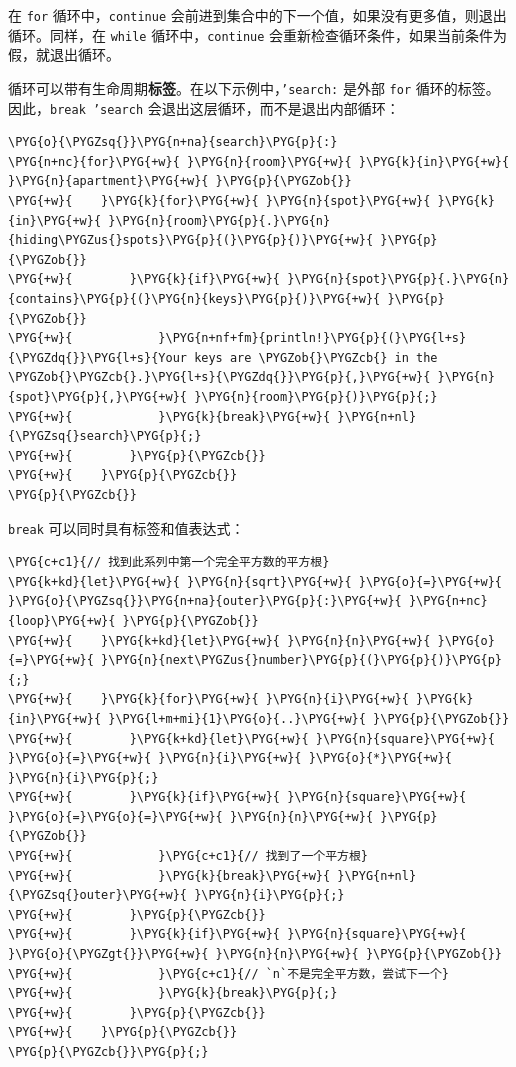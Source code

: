 在 \texttt{for} 循环中，\texttt{continue} 会前进到集合中的下一个值，如果没有更多值，则退出循环。同样，在 \texttt{while} 循环中，\texttt{continue} 会重新检查循环条件，如果当前条件为假，就退出循环。

循环可以带有生命周期\textbf{标签}。在以下示例中，\texttt{'search:} 是外部 \texttt{for} 循环的标签。因此，\texttt{break 'search} 会退出这层循环，而不是退出内部循环：

\begin{Verbatim}[commandchars=\\\{\},breaklines=true,breakanywhere=true,fontsize=\codefont,xleftmargin=17bp]
\PYG{o}{\PYGZsq{}}\PYG{n+na}{search}\PYG{p}{:}
\PYG{n+nc}{for}\PYG{+w}{ }\PYG{n}{room}\PYG{+w}{ }\PYG{k}{in}\PYG{+w}{ }\PYG{n}{apartment}\PYG{+w}{ }\PYG{p}{\PYGZob{}}
\PYG{+w}{    }\PYG{k}{for}\PYG{+w}{ }\PYG{n}{spot}\PYG{+w}{ }\PYG{k}{in}\PYG{+w}{ }\PYG{n}{room}\PYG{p}{.}\PYG{n}{hiding\PYGZus{}spots}\PYG{p}{(}\PYG{p}{)}\PYG{+w}{ }\PYG{p}{\PYGZob{}}
\PYG{+w}{        }\PYG{k}{if}\PYG{+w}{ }\PYG{n}{spot}\PYG{p}{.}\PYG{n}{contains}\PYG{p}{(}\PYG{n}{keys}\PYG{p}{)}\PYG{+w}{ }\PYG{p}{\PYGZob{}}
\PYG{+w}{            }\PYG{n+nf+fm}{println!}\PYG{p}{(}\PYG{l+s}{\PYGZdq{}}\PYG{l+s}{Your keys are \PYGZob{}\PYGZcb{} in the \PYGZob{}\PYGZcb{}.}\PYG{l+s}{\PYGZdq{}}\PYG{p}{,}\PYG{+w}{ }\PYG{n}{spot}\PYG{p}{,}\PYG{+w}{ }\PYG{n}{room}\PYG{p}{)}\PYG{p}{;}
\PYG{+w}{            }\PYG{k}{break}\PYG{+w}{ }\PYG{n+nl}{\PYGZsq{}search}\PYG{p}{;}
\PYG{+w}{        }\PYG{p}{\PYGZcb{}}
\PYG{+w}{    }\PYG{p}{\PYGZcb{}}
\PYG{p}{\PYGZcb{}}
\end{Verbatim}

\texttt{break} 可以同时具有标签和值表达式：

\begin{Verbatim}[commandchars=\\\{\},breaklines=true,breakanywhere=true,fontsize=\codefont,xleftmargin=17bp]
\PYG{c+c1}{// 找到此系列中第一个完全平方数的平方根}
\PYG{k+kd}{let}\PYG{+w}{ }\PYG{n}{sqrt}\PYG{+w}{ }\PYG{o}{=}\PYG{+w}{ }\PYG{o}{\PYGZsq{}}\PYG{n+na}{outer}\PYG{p}{:}\PYG{+w}{ }\PYG{n+nc}{loop}\PYG{+w}{ }\PYG{p}{\PYGZob{}}
\PYG{+w}{    }\PYG{k+kd}{let}\PYG{+w}{ }\PYG{n}{n}\PYG{+w}{ }\PYG{o}{=}\PYG{+w}{ }\PYG{n}{next\PYGZus{}number}\PYG{p}{(}\PYG{p}{)}\PYG{p}{;}
\PYG{+w}{    }\PYG{k}{for}\PYG{+w}{ }\PYG{n}{i}\PYG{+w}{ }\PYG{k}{in}\PYG{+w}{ }\PYG{l+m+mi}{1}\PYG{o}{..}\PYG{+w}{ }\PYG{p}{\PYGZob{}}
\PYG{+w}{        }\PYG{k+kd}{let}\PYG{+w}{ }\PYG{n}{square}\PYG{+w}{ }\PYG{o}{=}\PYG{+w}{ }\PYG{n}{i}\PYG{+w}{ }\PYG{o}{*}\PYG{+w}{ }\PYG{n}{i}\PYG{p}{;}
\PYG{+w}{        }\PYG{k}{if}\PYG{+w}{ }\PYG{n}{square}\PYG{+w}{ }\PYG{o}{=}\PYG{o}{=}\PYG{+w}{ }\PYG{n}{n}\PYG{+w}{ }\PYG{p}{\PYGZob{}}
\PYG{+w}{            }\PYG{c+c1}{// 找到了一个平方根}
\PYG{+w}{            }\PYG{k}{break}\PYG{+w}{ }\PYG{n+nl}{\PYGZsq{}outer}\PYG{+w}{ }\PYG{n}{i}\PYG{p}{;}
\PYG{+w}{        }\PYG{p}{\PYGZcb{}}
\PYG{+w}{        }\PYG{k}{if}\PYG{+w}{ }\PYG{n}{square}\PYG{+w}{ }\PYG{o}{\PYGZgt{}}\PYG{+w}{ }\PYG{n}{n}\PYG{+w}{ }\PYG{p}{\PYGZob{}}
\PYG{+w}{            }\PYG{c+c1}{// `n`不是完全平方数，尝试下一个}
\PYG{+w}{            }\PYG{k}{break}\PYG{p}{;}
\PYG{+w}{        }\PYG{p}{\PYGZcb{}}
\PYG{+w}{    }\PYG{p}{\PYGZcb{}}
\PYG{p}{\PYGZcb{}}\PYG{p}{;}
\end{Verbatim}

